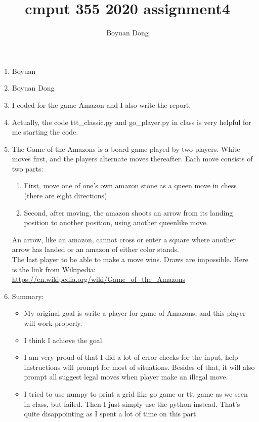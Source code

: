 \documentclass{article}
\title{\bf{cmput 355 2020  assignment4}}
\author{Boyuan Dong}
\begin{document}
   \maketitle
   \begin{enumerate}
  \item Boyuan \\
  \item Boyuan Dong\\
   \item I coded for the game Amazon and I also write the report.\\
   \item Actually, the code ttt\_classic.py and go\_player.py in class is very helpful for me starting the code.\\
   \item The Game of the Amazons is a board game played by two players.  White moves first, and the players alternate moves thereafter. Each move consists of two parts:
   \begin{enumerate}
   \item First, move one of one's own amazon stone as a queen move in chess (there are eight directions).
   \item Second, after moving, the amazon shoots an arrow from its landing position to another position, using another queenlike move.
   \end{enumerate}
   An arrow, like an amazon, cannot cross or enter a square where another arrow has landed or an amazon of either color stands.\\
   The last player to be able to make a move wins. Draws are impossible.
   Here is the link from Wikipedia:  \url{https://en.wikipedia.org/wiki/Game_of_the_Amazons}\\
   \item Summary:
   \begin{itemize}
   \item My original goal is write a player for game of Amazons, and this player will work properly.
   \item I think I achieve the goal.
   \item I am very proud of that I did a lot of error checks for the input, help instructions will prompt for most of situations. Besides of that, it will also prompt all suggest legal moves when player make an illegal move.
   \item I tried to use numpy to print a grid like go game or ttt game as we seen in class, but failed. Then I just simply use the python instead. That's quite disappointing as I spent a lot of time on this part.\\

\end{itemize}
\end{enumerate}
\end{document}
